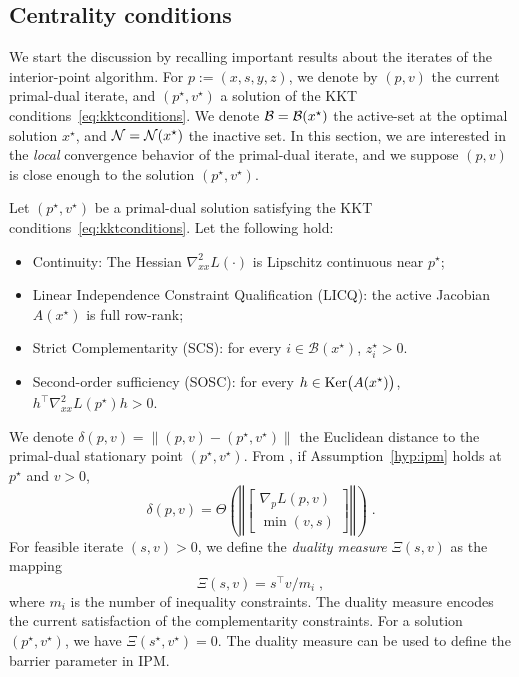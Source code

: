 \subsection{Centrality conditions}
We start the discussion by recalling important results about the iterates of the interior-point algorithm.
For $p := (x, s, y, z)$, we denote by
$(p, v)$ the current primal-dual iterate,
and $(p^\star, v^\star)$ a solution of the KKT conditions~\eqref{eq:kktconditions}.
We denote $\mathcal{B} = \mathcal{B}(x^\star)$ the active-set at the optimal solution $x^\star$,
and $\mathcal{N} = \mathcal{N}(x^\star)$ the inactive set.
In this section, we are interested in the \emph{local} convergence behavior of the
primal-dual iterate, and we suppose $(p, v)$ is close enough to the solution
$(p^\star, v^\star)$.

\begin{assumption}
  \label{hyp:ipm}
  Let $(p^\star, v^\star)$ be a primal-dual solution
  satisfying the KKT conditions~\eqref{eq:kktconditions}. Let the following hold:
  \begin{itemize}
  \item Continuity: The Hessian $\nabla^2_{x x} L(\cdot)$ is Lipschitz continuous
    near $p^\star$;
  \item Linear Independence Constraint Qualification (LICQ): the active Jacobian $A(x^\star)$ is full row-rank;
  \item Strict Complementarity (SCS): for every $i \in \mathcal{B}(x^\star)$, $z_i^\star > 0$.
  \item Second-order sufficiency (SOSC): for every $h \in \operatorname{Ker}\!\big(A(x^\star)\big)$,
    $h^\top \nabla_{x x}^2 L(p^\star)h > 0$.
  \end{itemize}
\end{assumption}

We denote $\delta(p, v) = \| (p, v) - (p^\star, v^\star) \|$ the Euclidean distance to the
primal-dual stationary point $(p^\star, v^\star)$.
From \cite[Theorem 2.2]{wright2001effects}, if Assumption~\ref{hyp:ipm}
holds at $p^\star$ and $v > 0$,
\begin{equation}
  \delta(p, v) = \Theta\left( \left\Vert \begin{bmatrix}
      \nabla_p L(p, v) \\ \min(v, s)
  \end{bmatrix}
  \right\Vert \right) \; .
\end{equation}
For feasible iterate $(s, v) > 0$, we define the \emph{duality measure} $\Xi(s, v)$ as the mapping
\begin{equation}
  \Xi(s, v) = s^\top v / m_i \; , %
\end{equation}
where $m_i$ is the number of inequality constraints.
The duality measure encodes the current satisfaction of the complementarity
constraints. For a solution $(p^\star, v^\star)$, we have $\Xi(s^\star, v^\star) = 0$.
The duality measure can be used to define the barrier parameter in IPM.

